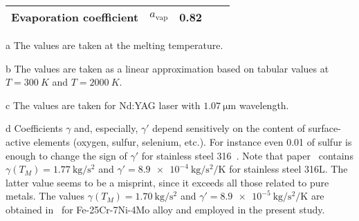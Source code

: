 \documentclass[final]{elsarticle} %
\newcommand{\evapor}[1]{{#1}_\text{vap}}
\begin{document}
\begin{table}
\begin{threeparttable}[b]
\begin{tabular}{lcccc}
        Evaporation coefficient & $\evapor{a}$ & \num{0.82} & & \cite{anisimov1968evaporation} \\[3pt]
        \hline
    \end{tabular}
    \begin{tablenotes}
        \item[a]\label{a} The values are taken at the melting temperature.
        \item[b]\label{b} The values are taken as a linear approximation based on tabular values at
            $T=\SI{300}{K}$ and $T=\SI{2000}{K}$.
        \item[c]\label{c} The values are taken for Nd:YAG laser with $\SI{1.07}{\um}$ wavelength.
        \item[d]\label{d} Coefficients $\gamma$ and, especially, $\gamma'$ depend sensitively
        on the content of surface-active elements (oxygen, sulfur, selenium, etc.).
        For instance even \SI{0.01}{\wtpercent} of sulfur is enough
        to change the sign of $\gamma'$ for stainless steel 316~\cite{mills2002recommended}.
        Note that paper~\cite{khairallah2016laser} contains $\gamma(T_M) = \SI{1.77}{\kg\per\square\s}$
        and $\gamma' = \SI{8.9e-4}{\kg\per\square\s\per\K}$ for stainless steel 316L.
        The latter value seems to be a misprint, since it exceeds all those related to pure metals.
        The values $\gamma(T_M) = \SI{1.70}{\kg\per\square\s}$ and $\gamma' = \SI{8.9e-5}{\kg\per\square\s\per\K}$
        are obtained in~\cite{schmidt2006surface} for Fe-25Cr-7Ni-4Mo alloy
        and employed in the present study.
    \end{tablenotes}
    \end{threeparttable}
\end{table}
\end{document}
